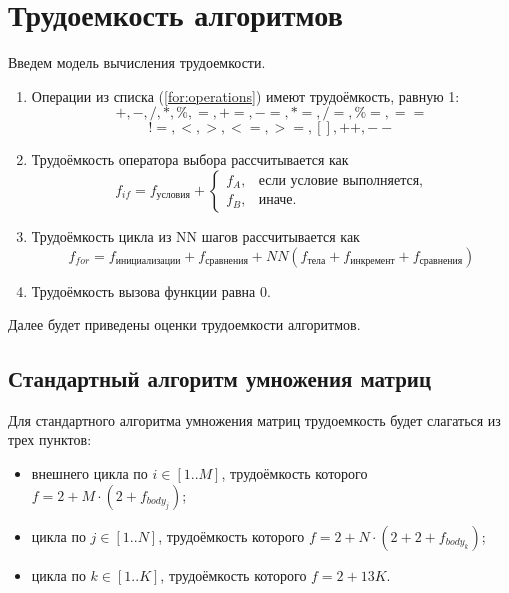 \section{Трудоемкость алгоритмов}
Введем модель вычисления трудоемкости.
\begin{enumerate}
	\item Операции из списка (\ref{for:operations}) имеют трудоёмкость, равную 1:
	\begin{equation}		
		+, -, /, *, \%, =, +=, -=, *=, /=, \%=, ==
		\nonumber
	\end{equation}
	\begin{equation}
		\label{for:operations}
		!=, <, >, <=, >=, [], ++, {-}-
	\end{equation}
	\item Трудоёмкость оператора выбора  рассчитывается как %
	\begin{equation}
		\label{for:if}
		f_{if} = f_{\text{условия}} +
		\begin{cases}
			f_A, & \text{если условие выполняется,}\\
			f_B, & \text{иначе.}
		\end{cases}
	\end{equation}
	\item Трудоёмкость цикла из NN шагов рассчитывается как %
	\begin{equation}
		\label{for:cycle}
		f_{for} = f_{\text{инициализации}} + f_{\text{сравнения}} + NN(f_{\text{тела}} + f_{\text{инкремент}} + f_{\text{сравнения}})
	\end{equation}
	\item Трудоёмкость вызова функции равна 0.
\end{enumerate}




Далее будет приведены оценки трудоемкости алгоритмов. 
\subsection{Стандартный алгоритм умножения матриц}

Для стандартного алгоритма умножения матриц трудоемкость будет слагаться из трех пунктов:
\newpage
\begin{itemize}
	\item внешнего цикла по $i \in [1..M]$, трудоёмкость которого $f = 2 + M \cdot (2 + f_{body_{j}})$;
	\item цикла по $j \in [1..N]$, трудоёмкость которого $f = 2 +  N \cdot (2 + 2 + f_{body_{k}})$;
	\item цикла по $k \in [1..K]$, трудоёмкость которого $f = 2 + 13K$.
\end{itemize}

